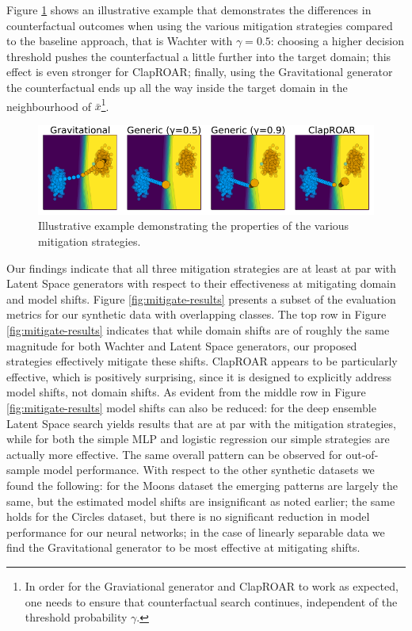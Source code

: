 \documentclass[conference,final,]{IEEEtran}
\theoremstyle{definition}
\theoremstyle{definition}
\theoremstyle{definition}
\theoremstyle{definition}
\theoremstyle{remark}
\begin{document}
Figure \ref{fig:mitigation} shows an illustrative example that demonstrates the differences in counterfactual outcomes when using the various mitigation strategies compared to the baseline approach, that is Wachter with \(\gamma=0.5\): choosing a higher decision threshold pushes the counterfactual a little further into the target domain; this effect is even stronger for ClapROAR; finally, using the Gravitational generator the counterfactual ends up all the way inside the target domain in the neighbourhood of \(\bar{x}\)\footnote{In order for the Graviational generator and ClapROAR to work as expected, one needs to ensure that counterfactual search continues, independent of the threshold probability \(\gamma\).}.

\begin{figure}

{\centering \includegraphics[width=0.9\linewidth]{www/mitigation} 

}

\caption{Illustrative example demonstrating the properties of the various mitigation strategies.}\label{fig:mitigation}
\end{figure}

Our findings indicate that all three mitigation strategies are at least at par with Latent Space generators with respect to their effectiveness at mitigating domain and model shifts. Figure \ref{fig:mitigate-results} presents a subset of the evaluation metrics for our synthetic data with overlapping classes. The top row in Figure \ref{fig:mitigate-results} indicates that while domain shifts are of roughly the same magnitude for both Wachter and Latent Space generators, our proposed strategies effectively mitigate these shifts. ClapROAR appears to be particularly effective, which is positively surprising, since it is designed to explicitly address model shifts, not domain shifts. As evident from the middle row in Figure \ref{fig:mitigate-results} model shifts can also be reduced: for the deep ensemble Latent Space search yields results that are at par with the mitigation strategies, while for both the simple MLP and logistic regression our simple strategies are actually more effective. The same overall pattern can be observed for out-of-sample model performance. With respect to the other synthetic datasets we found the following: for the Moons dataset the emerging patterns are largely the same, but the estimated model shifts are insignificant as noted earlier; the same holds for the Circles dataset, but there is no significant reduction in model performance for our neural networks; in the case of linearly separable data we find the Gravitational generator to be most effective at mitigating shifts.
\end{document}
